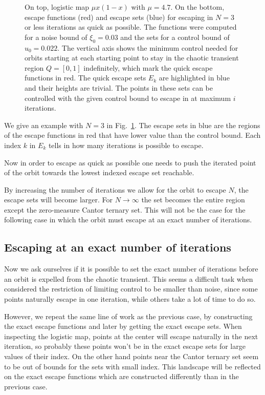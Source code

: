 \begin{figure}
    \caption{On top, logistic map $\mu x(1-x)$ with $\mu = 4.7$. On the bottom, escape functions (red) and escape sets (blue) for escaping in $N=3$ or less iterations as quick as possible. The functions were computed for a noise bound of $\xi_0 = 0.03$ and the sets for a control bound of $u_0 = 0.022$. The vertical axis shows the minimum control needed for orbits starting at each starting point to stay in the chaotic transient region $Q = [0,1]$ indefinitely, which mark the quick escape functions in red. The quick escape sets $E_k$ are highlighted in blue and their heights are trivial. The points in these sets can be controlled with the given control bound to escape in at maximum $i$ iterations.   }
    \label{fig:EscapeSetsQuick}
\end{figure}

We give an example with $N=3$ in Fig.~\ref{fig:EscapeSetsQuick}. The escape sets in blue are the regions of the escape functions in red that have lower value than the control bound. Each index $k$ in $E_k$ tells in how many iterations is possible to escape. 

Now in order to escape as quick as possible one needs to push the iterated point of the orbit towards the lowest indexed escape set reachable. 

By increasing the number of iterations we allow for the orbit to escape $N$, the escape sets will become larger. For $N\to\infty$ the set becomes the entire region except the zero-measure Cantor ternary set. This will not be the case for the following case in which the orbit must escape at an exact number of iterations.


\subsection{Escaping at an exact number of iterations}

Now we ask ourselves if it is possible to set the exact number of iterations before an orbit is expelled from the chaotic transient. This seems a difficult task when considered the restriction of limiting control to be smaller than noise, since some points naturally escape in one iteration, while others take a lot of time to do so. 

However, we repeat the same line of work as the previous case, by constructing the exact escape functions and later by getting the exact escape sets. When inspecting the logistic map, points at the center will escape naturally in the next iteration, so probably these points won't be in the exact escape sets for large values of their index. On the other hand points near the Cantor ternary set seem to be out of bounds for the sets with small index. This landscape will be reflected on the exact escape functions which are constructed differently than in the previous case.

